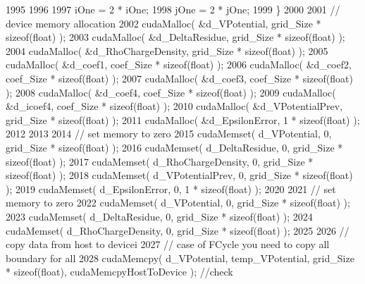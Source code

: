 \begin{DoxyCode}
1995 
1996 
1997         iOne = 2 * iOne;
1998         jOne = 2 * jOne;
1999     \}
2000 
2001     \textcolor{comment}{// device memory allocation}
2002     cudaMalloc( &d\_VPotential, grid\_Size * \textcolor{keyword}{sizeof}(\textcolor{keywordtype}{float}) );
2003     cudaMalloc( &d\_DeltaResidue, grid\_Size * \textcolor{keyword}{sizeof}(\textcolor{keywordtype}{float}) );
2004     cudaMalloc( &d\_RhoChargeDensity, grid\_Size * \textcolor{keyword}{sizeof}(\textcolor{keywordtype}{float}) );
2005     cudaMalloc( &d\_coef1, coef\_Size * \textcolor{keyword}{sizeof}(\textcolor{keywordtype}{float}) );
2006     cudaMalloc( &d\_coef2, coef\_Size * \textcolor{keyword}{sizeof}(\textcolor{keywordtype}{float}) );
2007     cudaMalloc( &d\_coef3, coef\_Size * \textcolor{keyword}{sizeof}(\textcolor{keywordtype}{float}) );
2008     cudaMalloc( &d\_coef4, coef\_Size * \textcolor{keyword}{sizeof}(\textcolor{keywordtype}{float}) );
2009     cudaMalloc( &d\_icoef4, coef\_Size * \textcolor{keyword}{sizeof}(\textcolor{keywordtype}{float}) );
2010     cudaMalloc( &d\_VPotentialPrev, grid\_Size * \textcolor{keyword}{sizeof}(\textcolor{keywordtype}{float}) );
2011     cudaMalloc( &d\_EpsilonError, 1 * \textcolor{keyword}{sizeof}(\textcolor{keywordtype}{float}) );   
2012         
2013 
2014     \textcolor{comment}{// set memory to zero}
2015     cudaMemset( d\_VPotential, 0, grid\_Size * \textcolor{keyword}{sizeof}(\textcolor{keywordtype}{float}) );
2016     cudaMemset( d\_DeltaResidue, 0, grid\_Size * \textcolor{keyword}{sizeof}(\textcolor{keywordtype}{float}) );
2017     cudaMemset( d\_RhoChargeDensity, 0, grid\_Size * \textcolor{keyword}{sizeof}(\textcolor{keywordtype}{float}) );
2018     cudaMemset( d\_VPotentialPrev, 0, grid\_Size * \textcolor{keyword}{sizeof}(\textcolor{keywordtype}{float}) );
2019     cudaMemset( d\_EpsilonError, 0, 1 * \textcolor{keyword}{sizeof}(\textcolor{keywordtype}{float}) );
2020 
2021     \textcolor{comment}{// set memory to zero}
2022     cudaMemset( d\_VPotential, 0, grid\_Size * \textcolor{keyword}{sizeof}(\textcolor{keywordtype}{float}) );
2023     cudaMemset( d\_DeltaResidue, 0, grid\_Size * \textcolor{keyword}{sizeof}(\textcolor{keywordtype}{float}) );
2024     cudaMemset( d\_RhoChargeDensity, 0, grid\_Size * \textcolor{keyword}{sizeof}(\textcolor{keywordtype}{float}) );
2025 
2026     \textcolor{comment}{// copy data from host to devicei}
2027     \textcolor{comment}{// case of FCycle you need to copy all boundary for all}
2028     cudaMemcpy( d\_VPotential, temp\_VPotential, grid\_Size * \textcolor{keyword}{sizeof}(\textcolor{keywordtype}{float}), cudaMemcpyHostToDevice ); \textcolor{comment}{//check}

\end{DoxyCode}
